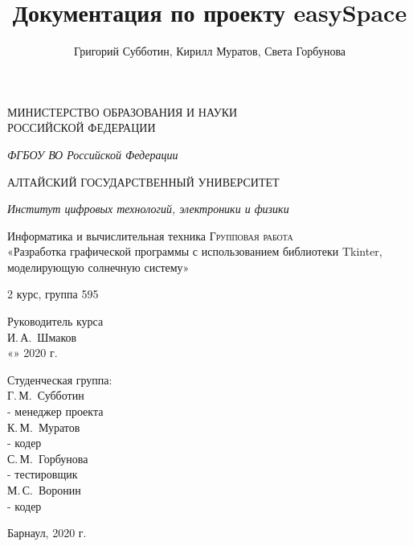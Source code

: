 \documentclass[11pt,a4paper]{report}
\author{Григорий Субботин, Кирилл Муратов, Света Горбунова}
\title{Документация по проекту easySpace}
\begin{document}
\begin{titlepage}
 \begin{center}
    \large
    МИНИСТЕРСТВО ОБРАЗОВАНИЯ И НАУКИ\\ РОССИЙСКОЙ ФЕДЕРАЦИИ
     
    \textit{ФГБОУ ВО Российской Федерации}
    \vspace{0.5cm}
 
    АЛТАЙСКИЙ ГОСУДАРСТВЕННЫЙ УНИВЕРСИТЕТ
    
    \vspace{0.25cm}
     
    \textit{Институт цифровых технологий, электроники и физики}
    
    \vfill 
    Информатика и вычислительная техника
    \vfill
    \textsc{Групповая работа}\\[5mm]
     
    {\LARGE «Разработка графической программы с использованием библиотеки Tkinter, моделирующую солнечную систему»}
  \bigskip
     
     2 курс, группа 595
\end{center}
\vfill
 
\newlength{\ML}
\hfill\begin{minipage}{0.5\textwidth}
  Руководитель курса\\
  \underline{\hspace{\ML}} И.\,А.~Шмаков\\
  «\underline{\hspace{0.5cm}}» \underline{\hspace{1cm}} 2020 г.
\end{minipage}%
\bigskip
 
\hfill\begin{minipage}{0.5\textwidth}
  Студенческая группа:\\
  \underline{\hspace{\ML}} Г.\,М.~Субботин  \\- менеджер проекта\\
  \underline{\hspace{\ML}} К.\,М.~Муратов \\- кодер\\
  \underline{\hspace{\ML}} С.\,М.~Горбунова  \\- тестировщик\\
   \underline{\hspace{\ML}} М.\,С.~Воронин  \\- кодер\\
\end{minipage}%
\vfill
 
\begin{center}
  Барнаул, 2020 г.
\end{center}
\end{titlepage}
\end{document}
